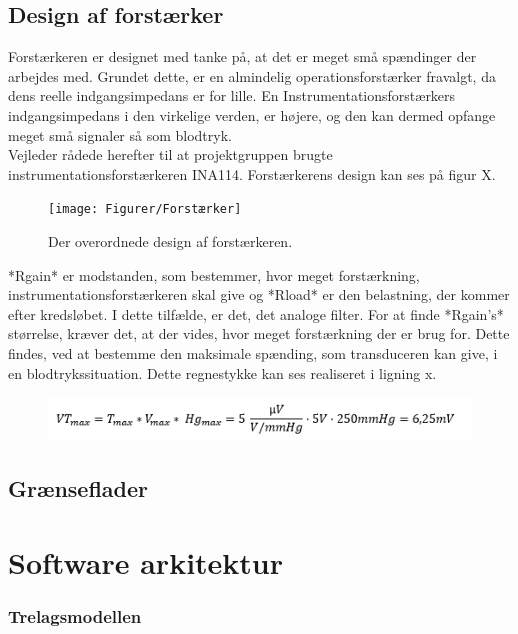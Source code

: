 \subsection{Design af forstærker}
Forstærkeren er designet med tanke på, at det er meget små spændinger der arbejdes med. Grundet dette, er en almindelig operationsforstærker fravalgt, da dens reelle indgangsimpedans er for lille. En Instrumentationsforstærkers indgangsimpedans i den virkelige verden, er højere, og den kan dermed opfange meget små signaler så som blodtryk.\\
Vejleder rådede herefter til at projektgruppen brugte instrumentationsforstærkeren INA114. Forstærkerens design kan ses på figur X.\\ 
\begin{figure}[h]
	\centering
	\texttt{[image: Figurer/Forstærker]}
	\caption{Der overordnede design af forstærkeren.}\label{labelpic}
\end{figure}
*Rgain* er modstanden, som bestemmer, hvor meget forstærkning, instrumentationsforstærkeren skal give og *Rload* er den belastning, der kommer efter kredsløbet. I dette tilfælde, er det, det analoge filter. For at finde *Rgain’s* størrelse, kræver det, at der vides, hvor meget forstærkning der er brug for. Dette findes, ved at bestemme den maksimale spænding, som transduceren kan give, i en blodtrykssituation. Dette regnestykke kan ses realiseret i ligning x.\\
\begin{figure}[h]
	\centering
	\includegraphics[width=1\textwidth]{Figurer/LigningSara}
\end{figure}



\subsection{Grænseflader}

\section{Software arkitektur}


\subsubsection{Trelagsmodellen}

